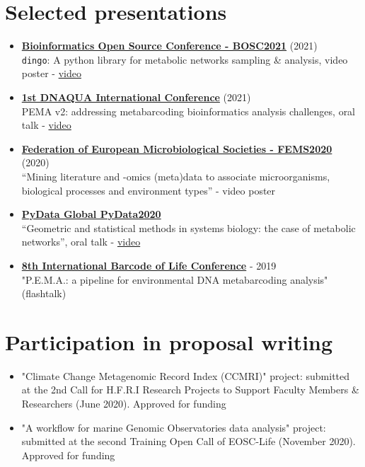 \section*{Selected presentations}
\begin{itemize}
   \item \textbf{\href{https://www.open-bio.org/events/bosc-2021/}{Bioinformatics Open Source Conference - BOSC2021}} (2021) \\
         \texttt{dingo}: A python library for metabolic networks sampling \& analysis, video poster - \href{https://www.youtube.com/watch?v=IyRD4N6iBu0&t=1s}{video}
   \item \textbf{\href{https://symposium.inrae.fr/dnaqua-conference-evian2021/}{1st DNAQUA International Conference}} (2021)\\
         PEMA v2: addressing metabarcoding bioinformatics analysis challenges, oral talk - \href{https://www.youtube.com/watch?v=kht_LKMmB6w}{video} 
   \item  \textbf{\href{https://fems2020belgrade.com/}{Federation of European Microbiological Societies - FEMS2020}} (2020) \\
         “Mining literature and -omics (meta)data to associate microorganisms, biological processes and environment types” - video poster
   \item \textbf{\href{https://pydata.org/global2020/}{PyData Global PyData2020}} \\
   “Geometric and statistical methods in systems biology: the case of metabolic networks”, oral talk - \href{https://www.youtube.com/watch?v=zg8KFZ_LbHM}{video}
   \item \textbf{\href{http://dnabarcodes2019.org/}{8th International Barcode of Life Conference}} - 2019 \\
   "P.E.M.A.: a pipeline for environmental DNA metabarcoding analysis" (flashtalk)
\end{itemize}


\section*{Participation in proposal writing}

\begin{itemize}
   \item "Climate Change Metagenomic Record Index (CCMRI)" project: submitted at the
   2nd Call for H.F.R.I Research Projects to Support Faculty Members \& Researchers (June 2020). 
   Approved for funding
   \item  "A workflow for marine Genomic Observatories data analysis" project: submitted at the second Training Open Call of EOSC-Life (November 2020). 
   Approved for funding 
\end{itemize}







